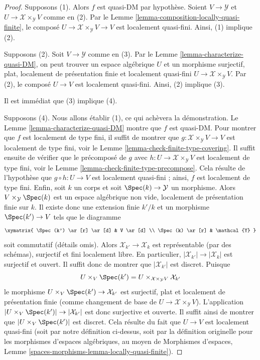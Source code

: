 \begin{proof}
Supposons (1). Alors $f$ est quasi-DM par hypothèse. Soient
$V \to \mathcal{Y}$ et $U \to \mathcal{X} \times_\mathcal{Y} V$
comme en (2). Par le Lemme \ref{lemma-composition-locally-quasi-finite}, le
composé $U \to \mathcal{X} \times_\mathcal{Y} V \to V$ est localement
quasi-fini. Ainsi, (1) implique (2).

\medskip\noindent
Supposons (2). Soit $V \to \mathcal{Y}$ comme en (3). Par le
Lemme \ref{lemma-characterize-quasi-DM}, on peut trouver un espace algébrique
$U$ et un morphisme surjectif, plat, localement de présentation finie et
localement quasi-fini $U \to \mathcal{X} \times_\mathcal{Y} V$.
Par (2), le composé $U \to V$ est localement quasi-fini. Ainsi, (2)
implique (3).

\medskip\noindent
Il est immédiat que (3) implique (4).

\medskip\noindent
Supposons (4). Nous allons établir (1), ce qui achèvera la démonstration.
Le Lemme \ref{lemma-characterize-quasi-DM} montre que $f$ est quasi-DM.
Pour montrer que $f$ est localement de type fini, il suffit de montrer que
$g : \mathcal{X} \times_\mathcal{Y} V \to V$ est localement de type fini,
voir le Lemme \ref{lemma-check-finite-type-covering}.
Il suffit ensuite de vérifier que le précomposé de $g$ avec
$h : U \to \mathcal{X} \times_\mathcal{Y} V$ est localement de type fini,
voir le Lemme \ref{lemma-check-finite-type-precompose}.
Cela résulte de l'hypothèse que $g \circ h : U \to V$ est localement
quasi-fini ; ainsi, $f$ est localement de type fini.
Enfin, soit $k$ un corps et soit $\Spec(k) \to \mathcal{Y}$ un morphisme.
Alors $V \times_\mathcal{Y} \Spec(k)$ est un espace algébrique non vide,
localement de présentation finie sur $k$. Il existe donc une extension finie
$k'/k$ et un morphisme $\Spec(k') \to V$ tels que le diagramme
$$
\xymatrix{
\Spec(k') \ar[r] \ar[d] & V \ar[d] \\
\Spec(k) \ar[r] & \mathcal{Y}
}
$$
soit commutatif (détails omis). Alors
$\mathcal{X}_{k'} \to \mathcal{X}_k$ est représentable (par des schémas),
surjectif et fini localement libre. En particulier,
$|\mathcal{X}_{k'}| \to |\mathcal{X}_k|$ est surjectif et ouvert.
Il suffit donc de montrer que $|\mathcal{X}_{k'}|$ est discret. Puisque
$$
U \times_V \Spec(k') =
U \times_{\mathcal{X} \times_\mathcal{Y} V} \mathcal{X}_{k'}
$$
le morphisme $U \times_V \Spec(k') \to \mathcal{X}_{k'}$ est surjectif,
plat et localement de présentation finie (comme changement de base de
$U \to \mathcal{X} \times_\mathcal{Y} V$). L'application
$|U \times_V \Spec(k')| \to |\mathcal{X}_{k'}|$ est donc surjective et
ouverte. Il suffit ainsi de montrer que $|U \times_V \Spec(k')|$ est discret.
Cela résulte du fait que $U \to V$ est localement quasi-fini (soit par notre
définition ci-dessus, soit par la définition originelle pour les morphismes
d'espaces algébriques, au moyen de Morphismes d'espaces,
Lemme \ref{spaces-morphisms-lemma-locally-quasi-finite}).
\end{proof}

